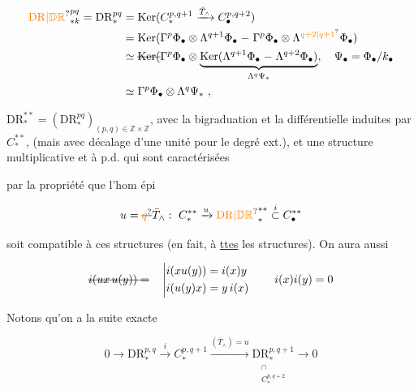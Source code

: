 \[
\begin{aligned}
\unsure{\mathrm{DR}|\mathbb{D}\mathbb{R}}_{*k}^{pq}=\mathrm{DR}_*^{pq}
 &=\operatorname{Ker}(C^{p,q+1}_*\xrightarrow{\bar T_\wedge}C^{p,q+2}_\bullet)\\
 &=\operatorname{Ker}(\Gamma^p\Phi_\bullet\otimes\Lambda^{q+1}\Phi_\bullet\relbar
 \Gamma^p\Phi_\bullet\otimes\Lambda^{\unsure{q+2|q+1}}\Phi_\bullet)\\
 &\simeq\deleted{\operatorname{Ker}(}\Gamma^p\Phi_\bullet\otimes
 \underbrace{\operatorname{Ker}(\Lambda^{q+1}\Phi_\bullet\relbar\Lambda^{q+2}\Phi_\bullet)}_{\Lambda^q\Psi_*},
 \quad\Psi_\bullet=\Phi_\bullet/k_\bullet\\
 &\simeq\Gamma^p\Phi_\bullet\otimes\Lambda^q\Psi_*\ ,
\end{aligned}
\]

$\mathrm{DR}_*^{**}=(\mathrm{DR}_*^{pq})_{(p,q)\in\mathbb Z\times\mathbb Z}$, avec la bigraduation et la différentielle  induites par $C_*^{**}$,  (mais avec décalage d'une unité pour le degré ext.), et une structure multiplicative  et à p.d. qui sont caractérisées


par la propriété que l'hom épi

\[
u=\deleted{\unsure{q}}\bar T_\wedge:\ C^{**}_*\xrightarrow{u}\unsure{\mathrm{DR}|\mathbb D\mathbb R}^{**}_*\mathrel{\overset{i}{\subset}}C^{**}_\bullet
\]

soit compatible à ces structures (en fait, à \uline{ttes} les structures). On aura aussi

\[
\deleted{i(ux\,u(y))=}\quad
\left|\begin{aligned}
i(xu(y))&=i(x)y\\
i(u(y)x)&=y\,i(x)
\end{aligned}\right.\qquad i(x)i(y)=0
\]

Notons qu'on a la suite exacte

\[
0\longrightarrow\mathrm{DR}^{p,q}_*\xrightarrow{i}C^{p,q+1}_*
\xrightarrow{(\bar T_\wedge)=u}\underset{\substack{\cap\\C^{p,q+2}_*}}{\mathrm{DR}^{p,q+1}_*}\longrightarrow0
\]

